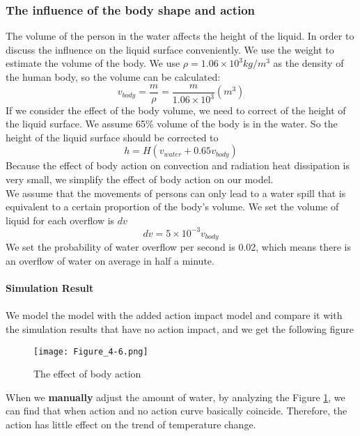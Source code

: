 \documentclass{mcmthesis}
\begin{document}
\subsubsection{The influence of the body shape and action}
The volume of the person in the water affects the height of the liquid. In order to discuss the influence on the liquid surface conveniently. We use the weight to estimate the volume of the body. We use $\rho =1.06\times10^{3}kg/m^{3}$ as the density of the human body, so the volume can be calculated:
\begin{equation}
v_{body}=\frac{m}{\rho }=\frac{m}{1.06\times 10^{3}}(m^{3})
\end{equation}
\indent If we consider the effect of the body volume, we need to correct of the height of the liquid surface. We assume 65\% volume of the body is in the water. So the height of the liquid surface should be corrected to\\
\begin{equation}
	h=H(v_{water}+0.65v_{body})
\end{equation}
\indent Because the effect of body action on convection and radiation heat dissipation is very small, we simplify the effect of body action on our model.\\
\indent We assume that the movements of persons can only lead to a water spill that is equivalent to a certain proportion of the body's volume. We set the volume of liquid for each overflow is $dv$
\begin{equation}
	dv=5\times10^{-3}v_{body}
\end{equation}\indent We set the probability of water overflow per second is 0.02, which means there is an overflow of water on average in half a minute.\\\\
\noindent
\textbf{Simulation Result}\\\\
\indent We model the model with the added action impact model and compare it with the simulation results that have no action impact, and we get the following figure
\begin{figure}[H]
	\centerline{\texttt{[image: Figure\_4-6.png]}}
	\caption{The effect of body action}
	\label{action}	
\end{figure}

When we \textbf{manually} adjust the amount of water, by analyzing the Figure \ref{action}, we can find that when action and no action curve basically coincide. Therefore, the action has little effect on the trend of temperature change.\\
\end{document}
